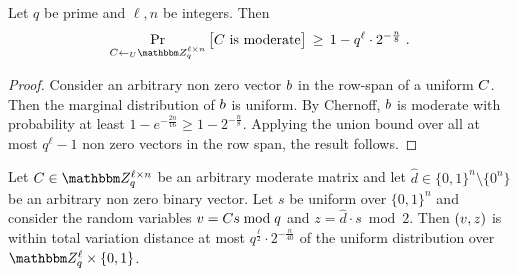 \begin{lemma}\label{lem:moderate}
Let $q$ be prime and $\ell,n$ be integers. Then 
$$\Pr_{\*C\leftarrow_U \mZ_q^{\ell\times n}}\big[\text{$\*C$ is moderate}\big]\,\geq \, 1 - q^\ell \cdot 2^{-\frac{n}{8}}\;.$$ 
\end{lemma}

\begin{proof}
Consider an arbitrary non zero vector $\*b$ in the row-span of a uniform $\*C$. Then the marginal distribution of $\*b$ is uniform. By Chernoff, $\*b$ is moderate with probability at least $1 - e^{-\frac{2n}{16}}\geq 1 - 2^{-\frac{n}{8}}$. Applying the union bound over all at most $q^{\ell} - 1$ non zero vectors in the row span, the result follows. 
\end{proof}


\begin{lemma}\label{lem:singled}
Let $\*C\in \mZ_q^{\ell\times n}$ be an arbitrary moderate matrix and let $\hat{d}\in\{0,1\}^n\setminus\{0^n\}$ be an arbitrary non zero binary vector. Let $s$ be uniform over $\{0,1\}^n$ and consider the random variables $\*v = \*C\*s \bmod q$ and $z = \hat{d}\cdot s \bmod 2$. Then $(\*v,z)$ is within total variation distance at most $q^{\frac{\ell}{2}}\cdot 2^{-\frac{n}{40}}$ of the uniform distribution over $\mZ_q^{\ell}\times\{0,1\}$. 
\end{lemma}

